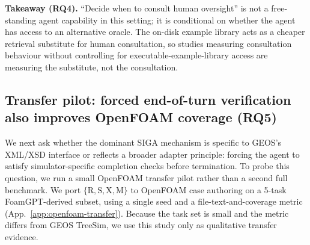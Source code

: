 \documentclass{article}
\begin{document}
\textbf{Takeaway (RQ4).} ``Decide when to consult human oversight'' is not a free-standing agent capability in this setting; it is conditional on whether the agent has access to an alternative oracle. The on-disk example library acts as a cheaper retrieval substitute for human consultation, so studies measuring consultation behaviour without controlling for executable-example-library access are measuring the substitute, not the consultation.

\subsection{Transfer pilot: forced end-of-turn verification also improves OpenFOAM coverage (RQ5)}
\label{subsec:openfoam-transfer}




We next ask whether the dominant SIGA mechanism is specific to GEOS's XML/XSD interface or reflects a broader adapter principle: forcing the agent to satisfy simulator-specific completion checks before termination. 
To probe this question, we run a small OpenFOAM transfer pilot rather than a second full benchmark. 
We port $\{\mathrm{R,S,X,M}\}$ to OpenFOAM case authoring on a 5-task FoamGPT-derived subset, using a single seed and a file-text-and-coverage metric (App.~\ref{app:openfoam-transfer}). 
Because the task set is small and the metric differs from GEOS TreeSim, we use this study only as qualitative transfer evidence.
\end{document}
